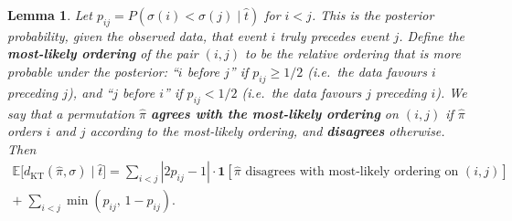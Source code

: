 \documentclass[11pt]{article}
\newtheorem{lemma}{Lemma}
\begin{document}
\begin{lemma}
Let $p_{ij} = P(\sigma(i) < \sigma(j) \mid \hat{t})$ for $i < j$. This is the posterior probability, given the observed data, that event $i$ truly precedes event $j$. Define the \textbf{most-likely ordering} of the pair $(i, j)$ to be the relative ordering that is more probable under the posterior: ``$i$ before $j$'' if $p_{ij} \ge 1/2$ (i.e.\ the data favours $i$ preceding $j$), and ``$j$ before $i$'' if $p_{ij} < 1/2$ (i.e.\ the data favours $j$ preceding $i$). We say that a permutation $\hat{\pi}$ \textbf{agrees with the most-likely ordering} on $(i,j)$ if $\hat{\pi}$ orders $i$ and $j$ according to the most-likely ordering, and \textbf{disagrees} otherwise. Then
\begin{multline}
\mathbb{E}\bigl[d_{\mathrm{KT}}(\hat{\pi}, \sigma) \mid \hat{t}\bigr] = \sum_{i < j} |2p_{ij} - 1| \cdot \mathbf{1}[\hat{\pi} \text{ disagrees with most-likely ordering on } (i, j)] \\
+\; \sum_{i<j} \min(p_{ij},\, 1 - p_{ij}).
\end{multline}
\end{lemma}
\end{document}
